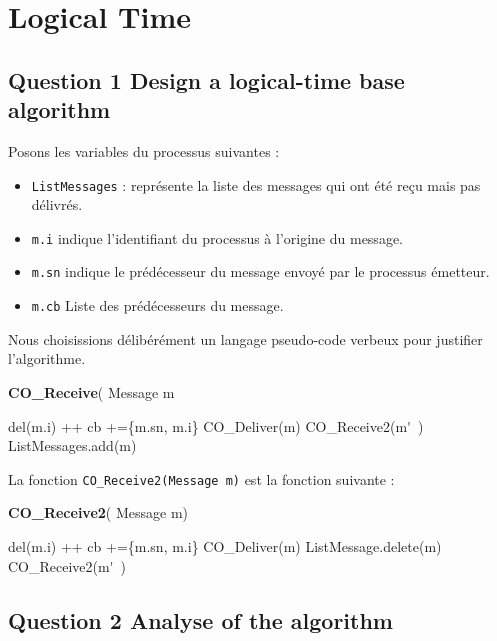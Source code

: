 \chapter{Logical Time}
\section{Question 1 Design a logical-time base algorithm}

Posons les variables du processus suivantes : 

\begin{itemize}
\item  \verb+ListMessages+ : représente la liste des messages qui ont été reçu mais pas délivrés.
\item \verb+m.i+ indique l'identifiant du processus à l'origine du message.
\item \verb+m.sn+ indique le prédécesseur du message envoyé par le processus émetteur.
\item \verb+m.cb+ Liste des prédécesseurs du message.
\end{itemize}
Nous choisissions délibérément un langage pseudo-code verbeux pour justifier l'algorithme.
\begin{algorithm}
  \caption{\textbf{CO\_Receive}( Message m}
\label{algo:receive}
\begin{algorithmic}[1]
     \STATE  del(m.i) ++
     \STATE  cb +=\{m.sn, m.i\}
   \STATE  CO\_Deliver(m)
   CO\_Receive2(m\'~)
   \ENDFOR
   \ELSE
   \STATE ListMessages.add(m)
  \ENDIF
 \end{algorithmic}
\end{algorithm}


La fonction \verb+CO_Receive2(Message m)+ est la fonction suivante : 
\begin{algorithm}
  \caption{\textbf{CO\_Receive2}( Message m)}
\label{algo:reveive2}
\begin{algorithmic}[1]
     \STATE  del(m.i) ++
     \STATE  cb +=\{m.sn, m.i\}
   \STATE  CO\_Deliver(m)
   \STATE  ListMessage.delete(m)
   CO\_Receive2(m\'~)
   \ENDFOR
  \ENDIF
 \end{algorithmic}
\end{algorithm}


\section{Question 2 Analyse of the algorithm}

